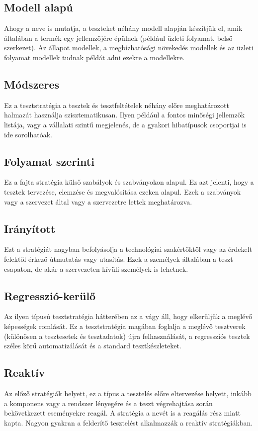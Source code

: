 \subsection{Modell alapú} Ahogy a neve is mutatja, a teszteket néhány modell alapján készítjük el, amik általában a termék egy jellemzőjére épülnek (például üzleti folyamat, belső szerkezet).	Az állapot modellek, a megbízhatósági növekedés modellek és az üzleti folyamat modellek tudnak példát adni ezekre a modellekre.


\subsection{Módszeres} Ez a tesztstratégia a tesztek és tesztfeltételek néhány előre meghatározott halmazát használja szisztematikusan. Ilyen például a fontos minőségi jellemzők listája, vagy a vállalati szintű megjelenés, de a  gyakori hibatípusok csoportjai is ide sorolhatóak.

\subsection{Folyamat szerinti} Ez a fajta stratégia külső szabályok és szabványokon alapul. Ez azt jelenti, hogy a tesztek tervezése, elemzése és megvalósítása ezeken alapul. Ezek a szabványok vagy a szervezet által vagy a szervezetre lettek meghatározva.

\subsection{Irányított} Ezt a stratégiát nagyban befolyásolja a technológiai szakértőktől vagy az érdekelt felektől érkező útmutatás vagy utasítás. Ezek a személyek általában a teszt csapaton, de akár a szervezeten kívüli személyek is lehetnek.

\subsection{Regresszió-kerülő} Az ilyen típusú tesztstratégia hátterében az a vágy áll, hogy elkerüljük a meglévő képességek romlását. Ez a tesztstratégia magában foglalja a meglévő tesztverek (különösen a tesztesetek és tesztadatok) újra felhasználását, a regressziós tesztek széles körű automatizálását és a standard tesztkészleteket\cite{syllabus4}.

\subsection{Reaktív} Az előző stratégiák helyett, ez a típus a tesztelés előre eltervezése helyett, inkább a komponens vagy a rendszer lényegére és a teszt végrehajtása során bekövetkezett eseményekre reagál. A stratégia a nevét is a reagálás rész miatt kapta. Nagyon gyakran a felderítő tesztelést alkalmazzák a reaktív stratégiákban\cite{syllabus4}.

